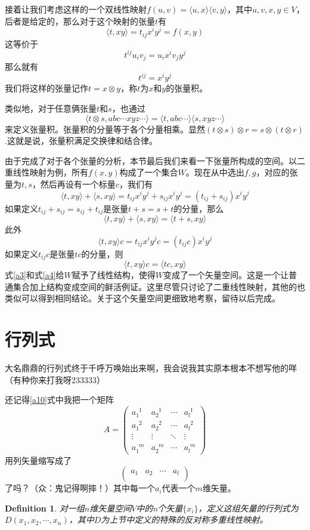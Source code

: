 \documentclass[11pt,a4paper,openany]{book}%
\theoremstyle{plain}%
\newtheorem{defi}{Definition}[chapter]%
\begin{document}
接着让我们考虑这样的一个双线性映射$f(u,v)=\langle u, x \rangle\langle v, y \rangle$，其中$u,v,x,y \in V$，后者是给定的，那么对于这个映射的张量$t$有
\[
\langle t,xy\rangle=t_{ij}x^iy^j=f(x,y)
\]
这等价于
\[
t^{ij}u_iv_j=u_ix^iv_jy^j
\]
那么就有
\[
t^{ij}=x^iy^j
\]
我们将这样的张量记作$t=x\otimes y$，称$t$为$x$和$y$的{\kaishu 张量积}。

类似地，对于任意俩张量$t$和$s$，也通过
\[
\langle t\otimes s ,abc\cdots xyz \cdots\rangle=\langle t, abc\cdots \rangle\langle s, xyz \cdots \rangle
\]
来定义张量积。张量积的分量等于各个分量相乘。显然$(t\otimes s)\otimes r=s\otimes (t\otimes r)$.这就是说，张量积满足交换律和结合律。

由于完成了对于各个张量的分析，本节最后我们来看一下张量所构成的空间。以二重线性映射为例，所有$f(x,y)$构成了一个集合$W$。现在从中选出$f,g$，对应的张量为$t,s$，然后再设有一个标量$c$，我们有
\[
\langle t,xy\rangle+\langle s,xy\rangle=t_{ij}x^iy^j+s_{ij}x^iy^j=(t_{ij}+s_{ij})x^iy^j
\]
如果定义$t_{ij}+s_{ij}=s_{ij}+t_{ij}$是张量$t+s=s+t$的分量，那么
\begin{equation}
\label{a3}
\langle t,xy\rangle+\langle s,xy\rangle=\langle t+s,xy\rangle
\end{equation}
此外
\[
\langle t,xy\rangle c=t_{ij}x^iy^jc=(t_{ij}c)x^iy^j
\]
如果定义$t_{ij}c$是张量$tc$的分量，则
\begin{equation}
\label{a4}
\langle t,xy\rangle c=\langle tc,xy\rangle
\end{equation}
式\eqref{a3}和式\eqref{a4}给$W$赋予了线性结构，使得$W$变成了一个矢量空间。这是一个让普通集合加上结构变成空间的鲜活例证。这里尽管只讨论了二重线性映射，其他的也类似可以得到相同结论。关于这个矢量空间更细致地考察，留待以后完成。
\section{行列式}
大名鼎鼎的行列式终于千呼万唤始出来啊，我会说我其实原本根本不想写他的咩（有种你来打我呀233333）

还记得\eqref{a10}式中我把一个矩阵
\[
A=\begin{pmatrix}
a_{1}^{\phantom{1}1} & a_{2}^{\phantom{2}1} & \cdots & a_{l}^{\phantom{l}1}\\
a_{1}^{\phantom{1}2} & a_{2}^{\phantom{2}2} & \cdots & a_{l}^{\phantom{l}2}\\
\vdots & \vdots & \ddots & \vdots \\
a_{1}^{\phantom{1}m} & a_{2}^{\phantom{2}m} & \cdots & a_{l}^{\phantom{l}m}
\end{pmatrix}
\]
用列矢量缩写成了
\[
\begin{pmatrix}
a_{1} & a_{2} & \cdots & a_{l}\\
\end{pmatrix}
\]
了吗？（众：鬼记得啊摔！）其中每一个$a_i$代表一个$m$维矢量。
\begin{defi}
对一组$n$维矢量空间$V$中的n个矢量$\{x_i\}$，定义这组矢量的行列式为$D(x_1,x_2,\cdots,x_n)$，其中$D$为上节中定义的特殊的反对称多重线性映射。
\end{defi}
\end{document}
